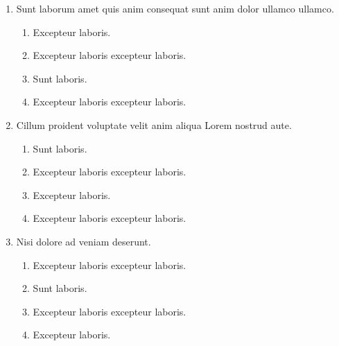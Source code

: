 \documentclass[a4paper,12pt]{article}
\begin{document}
\begin{enumerate}[label=\textbf{\arabic*.}]
\begin{multicols}{2}
\begin{enumerate}
	\end{enumerate}

\end{multicols}
\item Sunt laborum amet quis anim consequat sunt anim dolor ullamco ullamco.
\begin{multicols}{2}
	\begin{enumerate}
		\item  Excepteur laboris.
    
		\item  Excepteur laboris excepteur laboris.
    
		\item  Sunt laboris.
    
		\item  Excepteur laboris excepteur laboris.
  
	\end{enumerate}

\end{multicols}
\item Cillum proident voluptate velit anim aliqua Lorem nostrud aute.
\begin{multicols}{2}
	\begin{enumerate}
		\item  Sunt laboris.
    
		\item  Excepteur laboris excepteur laboris.
    
		\item  Excepteur laboris.
    
		\item  Excepteur laboris excepteur laboris.
  
	\end{enumerate}

\end{multicols}
\item Nisi dolore ad veniam deserunt.
\begin{multicols}{2}
	\begin{enumerate}
		\item  Excepteur laboris excepteur laboris.
    
		\item  Sunt laboris.
    
		\item  Excepteur laboris excepteur laboris.
  
		\item  Excepteur laboris.
    
	\end{enumerate}


\end{multicols}
\end{enumerate}
\end{document}
